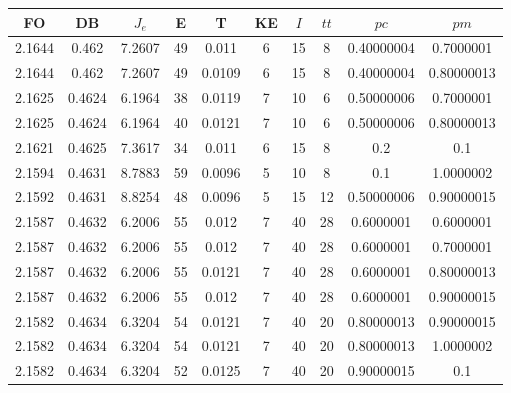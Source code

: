 \begin{table}[h!]
    \footnotesize
    \begin{center}
        \begin{tabular}{|c|c|c|c|c|c|c|c|c|c|}
        \hline
            {\bf FO} & {\bf DB} & $J_e$ & {\bf E} & {\bf T} & {\bf KE} & $I$ & $tt$ & $pc$ & $pm$ \\
        \hline
        \hline
            2.1644 & 0.462  & 7.2607 & 49 & 0.011 & 6 & 15 & 8 & 0.40000004 & 0.7000001\\
        \hline
        \hline
            2.1644 & 0.462  & 7.2607 & 49 & 0.0109 & 6 & 15 & 8 & 0.40000004 & 0.80000013\\
        \hline
        \hline
            2.1625 & 0.4624  & 6.1964 & 38 & 0.0119 & 7 & 10 & 6 & 0.50000006 & 0.7000001\\
        \hline
        \hline
            2.1625 & 0.4624  & 6.1964 & 40 & 0.0121 & 7 & 10 & 6 & 0.50000006 & 0.80000013\\
        \hline
        \hline
            2.1621 & 0.4625  & 7.3617 & 34 & 0.011 & 6 & 15 & 8 & 0.2 & 0.1\\
        \hline
        \hline
            2.1594 & 0.4631  & 8.7883 & 59 & 0.0096 & 5 & 10 & 8 & 0.1 & 1.0000002\\
        \hline
        \hline
            2.1592 & 0.4631  & 8.8254 & 48 & 0.0096 & 5 & 15 & 12 & 0.50000006 & 0.90000015\\
        \hline
        \hline
            2.1587 & 0.4632  & 6.2006 & 55 & 0.012 & 7 & 40 & 28 & 0.6000001 & 0.6000001\\
        \hline
        \hline
            2.1587 & 0.4632  & 6.2006 & 55 & 0.012 & 7 & 40 & 28 & 0.6000001 & 0.7000001\\
        \hline
        \hline
            2.1587 & 0.4632  & 6.2006 & 55 & 0.0121 & 7 & 40 & 28 & 0.6000001 & 0.80000013\\
        \hline
        \hline
            2.1587 & 0.4632  & 6.2006 & 55 & 0.012 & 7 & 40 & 28 & 0.6000001 & 0.90000015\\
        \hline
        \hline
            2.1582 & 0.4634  & 6.3204 & 54 & 0.0121 & 7 & 40 & 20 & 0.80000013 & 0.90000015\\
        \hline
        \hline
            2.1582 & 0.4634  & 6.3204 & 54 & 0.0121 & 7 & 40 & 20 & 0.80000013 & 1.0000002\\
        \hline
        \hline
            2.1582 & 0.4634  & 6.3204 & 52 & 0.0125 & 7 & 40 & 20 & 0.90000015 & 0.1\\

\end{tabular}
\end{center}
\end{table}
